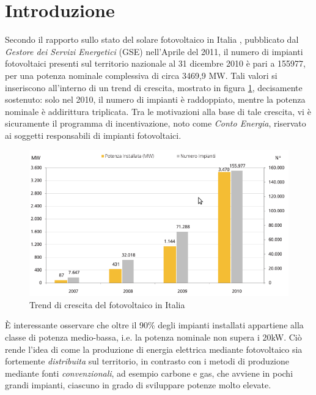 \clearpage{\pagestyle{empty}\cleardoublepage}
\chapter*{Introduzione} 
%

%
Secondo il rapporto sullo stato del solare fotovoltaico in Italia
\cite{gse2010}, pubblicato dal \emph{Gestore dei Servizi Energetici}
(GSE) nell'Aprile del 2011, il numero di impianti fotovoltaici
presenti sul territorio nazionale al 31 dicembre 2010 \`e pari 
a 155977, per una potenza nominale complessiva di circa 3469,9 MW.
%
Tali valori si inseriscono all'interno di un trend di crescita, 
mostrato in figura \ref{fotovoltaico-italia}, decisamente sostenuto: 
solo nel 2010, il numero di impianti \`e raddoppiato, mentre la potenza 
nominale \`e addirittura triplicata.
%
Tra le motivazioni alla base di tale crescita, vi \`e sicuramente il 
programma di incentivazione, noto come \emph{Conto Energia}\cite{camera2003},
riservato ai soggetti responsabili di impianti fotovoltaici.
\begin{figure}[!h]
\centering
\includegraphics[width=350pt]{img/trend-fotovoltaico-italia.png}
\caption{Trend di crescita del fotovoltaico in Italia}
\label{fotovoltaico-italia}
\end{figure}
%
\`E interessante osservare che oltre il 90\% degli impianti installati
appartiene alla classe di potenza medio-bassa, i.e. la potenza nominale
non supera i 20kW. 
%
Ci\`o rende l'idea di come la produzione di energia
elettrica mediante fotovoltaico sia fortemente \emph{distribuita} 
sul territorio, in contrasto con i metodi di produzione mediante 
fonti \emph{convenzionali}, ad esempio carbone e gas, che avviene 
in pochi grandi impianti, ciascuno in grado di sviluppare potenze molto 
elevate.
%

